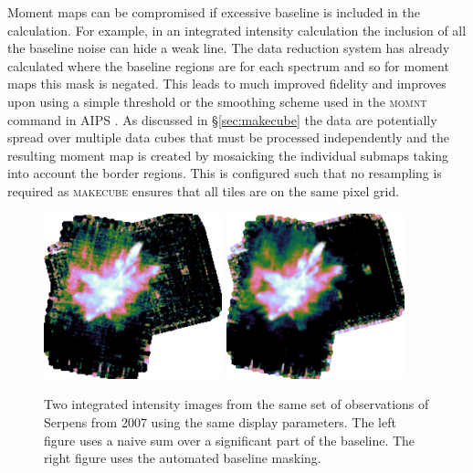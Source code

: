 \documentclass[final,authoryear,5p,times,twocolumn]{elsarticle}
\begin{document}
Moment maps can be compromised if excessive baseline is included in
the calculation. For example, in an integrated intensity calculation
the inclusion of all the baseline noise can hide a weak line. The data
reduction system has already calculated where the baseline regions are
for each spectrum and so for moment maps this mask is negated. This
leads to much improved fidelity and improves upon using a simple threshold or
the smoothing scheme used in the \textsc{momnt} command in AIPS
\cite[][ascl:9911.003]{2003ASSL..285..109G}. As discussed in \S \ref{sec:makecube}
the data are potentially spread over multiple data cubes that must be
processed independently and the resulting moment map is created by
mosaicking the individual submaps taking into account the border
regions. This is configured such that no resampling is required as
\textsc{makecube} ensures that all tiles are on the same pixel grid.

\begin{figure}
\begin{minipage}{\textwidth}
\centering
\includegraphics[width=0.46\textwidth]{integ_manual.png}
\includegraphics[width=0.46\textwidth]{integ_auto.png}
\caption{Two integrated intensity images from the same set of
  observations of Serpens from 2007 using the same display
  parameters. The left figure uses a naive sum over a significant part
  of the baseline. The right figure uses the automated baseline
  masking.}
\label{fig:integ}
\end{minipage}
\end{figure}
\end{document}
